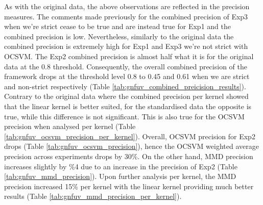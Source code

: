 \documentclass{mpaper}
\begin{document}
As with the original data, the above observations are reflected in the precision measures. The comments made previously for the combined precision of Exp3 when we're strict cease to be true and are instead true for Exp1 and the combined precision is low. Nevertheless, similarly to the original data the combined precision is extremely high for Exp1 and Exp3 we're not strict with OCSVM. The Exp2 combined precision is almost half what it is for the original data at the 0.8 threshold. Consequently, the overall combined precision of the framework drops at the threshold level 0.8 to 0.45 and 0.61 when we are strict and non-strict respectively (Table \ref{tab:gnfuv_combined_preicision_results}). Contrary to the original data where the combined precision per kernel showed that the linear kernel is better suited, for the standardised data the opposite is true, while this difference is not significant. This is also true for the OCSVM precision when analysed per kernel (Table \ref{tab:gnfuv_ocsvm_precision_per_kernel}).  Overall, OCSVM precision for Exp2 drops (Table \ref{tab:gnfuv_ocsvm_precision}), hence the OCSVM weighted average precision across experiments drops by 30\%. On the other hand, MMD precision increases slightly by \%4 due to an increase in the precision of Exp2 (Table \ref{tab:gnfuv_mmd_precision}). Upon further analysis per kernel, the MMD precision increased 15\% per kernel with the linear kernel providing much better results (Table \ref{tab:gnfuv_mmd_precision_per_kernel}).
\end{document}
